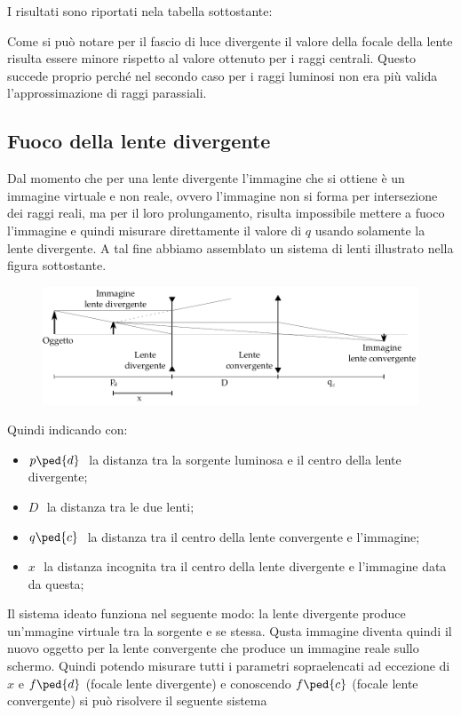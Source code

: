 I risultati sono riportati nela tabella sottostante:



Come si può notare per il fascio di luce divergente il valore della focale della lente risulta essere minore rispetto al valore ottenuto per i raggi centrali. Questo succede proprio perché nel secondo caso per i raggi luminosi non era più valida l'approssimazione di raggi parassiali.

\subsection{Fuoco della lente divergente}

Dal momento che per una lente divergente l'immagine che si ottiene è un immagine virtuale e non reale, ovvero l'immagine non si forma per intersezione dei raggi reali, ma per il loro prolungamento, risulta impossibile mettere a fuoco l'immagine e quindi misurare direttamente il valore di $q$ usando solamente la lente divergente.
A tal fine abbiamo assemblato un sistema di lenti illustrato nella figura sottostante.

\begin{figure}[b!]
	\includegraphics[width=16cm]{drawing2.pdf}
\end{figure}


Quindi indicando con:
\begin{itemize}
	\item{$p\ped{d}\,\,$ la distanza tra la sorgente luminosa e il centro della lente divergente;}
	\item{$D\,\,$ la distanza tra le due lenti;}
	\item{$q\ped{c}\,\,$ la distanza tra il centro della lente convergente e l'immagine;}
	\item{$x\,\,$ la distanza incognita tra il centro della lente divergente e l'immagine data da questa;}
\end{itemize}
Il sistema ideato funziona nel seguente modo: la lente divergente produce un'mmagine virtuale tra la sorgente e se stessa. Qusta immagine diventa quindi il nuovo oggetto per la lente convergente che produce un immagine reale sullo schermo. Quindi potendo misurare tutti i parametri sopraelencati ad eccezione di $x$ e $f\ped{d}$ (focale lente divergente) e conoscendo $f\ped{c}$ (focale lente convergente) si può risolvere il seguente sistema

